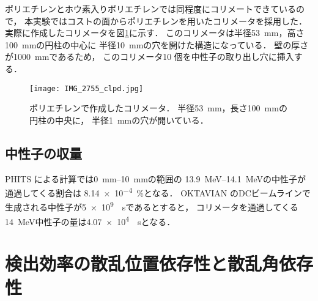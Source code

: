 \documentclass[../master]{subfiles}
\begin{document}
ポリエチレンとホウ素入りポリエチレンでは同程度にコリメートできているので，
本実験ではコストの面からポリエチレンを用いたコリメータを採用した．
実際に作成したコリメータを図\ref{pic::collimator}に示す．
このコリメータは半径\SI{53}{\milli\metre}，高さ\SI{100}{\milli\metre}の円柱の中心に
半径\SI{10}{\milli\metre}の穴を開けた構造になっている．
壁の厚さが\SI{1000}{\milli\metre}であるため，
このコリメータ10 個を中性子の取り出し穴に挿入する．
\begin{figure}
  \centering
  \texttt{[image: IMG\_2755\_clpd.jpg]}
  \caption[ポリエチレンで作成したコリメータ．]
          {ポリエチレンで作成したコリメータ．
            半径\SI{53}{\milli\metre}，長さ\SI{100}{\milli\metre}の円柱の中央に，
          半径\SI{1}{\milli\metre}の穴が開いている．}
  \label{pic::collimator}
\end{figure}

\subsection{中性子の収量}
PHITS による計算では\SIrange{0}{10}{\milli\metre}の範囲の
\SIrange{13.9}{14.1}{\mega\electronvolt}の中性子が通過してくる割合は
\SI{8.14e-4}{\percent}となる．
OKTAVIAN のDCビームラインで生成される中性子が\SI{5e9}{\per\second}であるとすると，
コリメータを通過してくる\SI{14}{\mega\electronvolt}中性子の量は\SI{4.07e4}{\per\second}となる．

\section{検出効率の散乱位置依存性と散乱角依存性}
\end{document}
